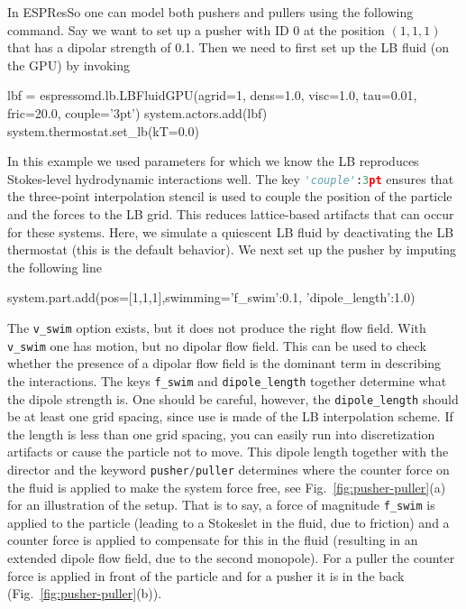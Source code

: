 \documentclass[aip,jcp,reprint,a4paper,onecolumn,amsmath]{revtex4-1}
\newcommand{\es}{\mbox{\textsf{ESPResSo}}\xspace}
\newcommand\codees{\lstinline[language=python]}
\begin{document}
In \es{} one can model both pushers and pullers using the following command. Say we want to set up a pusher with ID 0 at the position $(1,1,1)$ that has a dipolar strength of 0.1. Then we need to first set up the LB fluid (on the GPU) by invoking
\begin{espresso}
lbf = espressomd.lb.LBFluidGPU(agrid=1, dens=1.0, visc=1.0, tau=0.01, fric=20.0, couple='3pt')
system.actors.add(lbf)
system.thermostat.set_lb(kT=0.0)
\end{espresso}
In this example we used parameters for which we know the LB reproduces Stokes-level hydrodynamic interactions well. The key \codees{'couple':3pt} ensures that the three-point interpolation stencil is used to couple the position of the particle and the forces to the LB grid. This reduces lattice-based artifacts that can occur for these systems. Here, we simulate a quiescent LB fluid by deactivating the LB thermostat (this is the default behavior). We next set up the pusher by imputing the following line
\begin{espresso}
system.part.add(pos=[1,1,1],swimming={'f_swim':0.1, 'dipole_length':1.0})
\end{espresso}
The \codees{v_swim} option exists, but it does not produce the right flow field. With \codees{v_swim} one has motion, but no dipolar flow field. This can be used to check whether the presence of a dipolar flow field is the dominant term in describing the interactions. The keys \codees{f_swim} and \codees{dipole_length} together determine what the dipole strength is. One should be careful, however, the \codees{dipole_length} should be at least one grid spacing, since use is made of the LB interpolation scheme. If the length is less than one grid spacing, you can easily run into discretization artifacts or cause the particle not to move. This dipole length together with the director and the keyword \codees{pusher/puller} determines where the counter force on the fluid is applied to make the system force free, see Fig.~\ref{fig:pusher-puller}(a) for an illustration of the setup. That is to say, a force of magnitude \codees{f_swim} is applied to the particle (leading to a Stokeslet in the fluid, due to friction) and a counter force is applied to compensate for this in the fluid (resulting in an extended dipole flow field, due to the second monopole). For a puller the counter force is applied in front of the particle and for a pusher it is in the back (Fig.~\ref{fig:pusher-puller}(b)).
\end{document}
